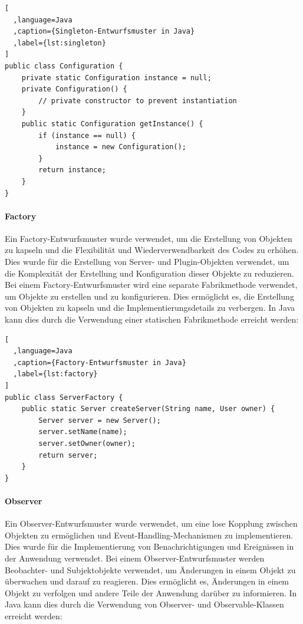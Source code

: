 \begin{lstlisting}[
  ,language=Java
  ,caption={Singleton-Entwurfsmuster in Java}
  ,label={lst:singleton}
]
public class Configuration {
    private static Configuration instance = null;
    private Configuration() {
        // private constructor to prevent instantiation
    }
    public static Configuration getInstance() {
        if (instance == null) {
            instance = new Configuration();
        }
        return instance;
    }
}
\end{lstlisting}

\paragraph{Factory}\label{factory} Ein Factory-Entwurfsmuster wurde verwendet, um die Erstellung von Objekten zu kapseln und die Flexibilität und Wiederverwendbarkeit des Codes zu erhöhen. Dies wurde für die Erstellung von Server- und Plugin-Objekten verwendet, um die Komplexität der Erstellung und Konfiguration dieser Objekte zu reduzieren. Bei einem Factory-Entwurfsmuster wird eine separate Fabrikmethode verwendet, um Objekte zu erstellen und zu konfigurieren. Dies ermöglicht es, die Erstellung von Objekten zu kapseln und die Implementierungsdetails zu verbergen. In Java kann dies durch die Verwendung einer statischen Fabrikmethode erreicht werden:

\begin{lstlisting}[
  ,language=Java
  ,caption={Factory-Entwurfsmuster in Java}
  ,label={lst:factory}
]
public class ServerFactory {
    public static Server createServer(String name, User owner) {
        Server server = new Server();
        server.setName(name);
        server.setOwner(owner);
        return server;
    }
}
\end{lstlisting}

\paragraph{Observer}\label{observer} Ein Observer-Entwurfsmuster wurde verwendet, um eine lose Kopplung zwischen Objekten zu ermöglichen und Event-Handling-Mechanismen zu implementieren. Dies wurde für die Implementierung von Benachrichtigungen und Ereignissen in der Anwendung verwendet. Bei einem Observer-Entwurfsmuster werden Beobachter- und Subjektobjekte verwendet, um Änderungen in einem Objekt zu überwachen und darauf zu reagieren. Dies ermöglicht es, Änderungen in einem Objekt zu verfolgen und andere Teile der Anwendung darüber zu informieren. In Java kann dies durch die Verwendung von Observer- und Observable-Klassen erreicht werden:


